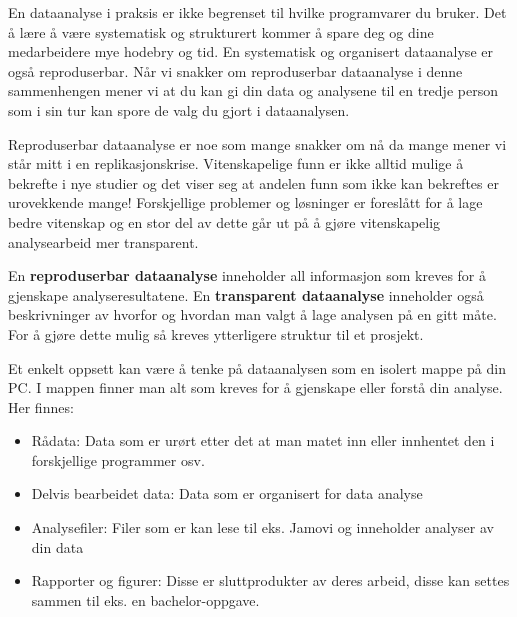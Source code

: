 \documentclass[
  letterpaper,
  DIV=11,
  numbers=noendperiod,
  oneside]{scrreprt}
\begin{document}

En dataanalyse i praksis er ikke begrenset til hvilke programvarer du
bruker. Det å lære å være systematisk og strukturert kommer å spare deg
og dine medarbeidere mye hodebry og tid. En systematisk og organisert
dataanalyse er også reproduserbar. Når vi snakker om reproduserbar
dataanalyse i denne sammenhengen mener vi at du kan gi din data og
analysene til en tredje person som i sin tur kan spore de valg du gjort
i dataanalysen.

Reproduserbar dataanalyse er noe som mange snakker om nå da mange mener
vi står mitt i en replikasjonskrise. Vitenskapelige funn er ikke alltid
mulige å bekrefte i nye studier og det viser seg at andelen funn som
ikke kan bekreftes er urovekkende mange! Forskjellige problemer og
løsninger er foreslått for å lage bedre vitenskap og en stor del av
dette går ut på å gjøre vitenskapelig analysearbeid mer transparent.

En \textbf{reproduserbar dataanalyse} inneholder all informasjon som
kreves for å gjenskape analyseresultatene. En \textbf{transparent
dataanalyse} inneholder også beskrivninger av hvorfor og hvordan man
valgt å lage analysen på en gitt måte. For å gjøre dette mulig så kreves
ytterligere struktur til et prosjekt.

Et enkelt oppsett kan være å tenke på dataanalysen som en isolert mappe
på din PC. I mappen finner man alt som kreves for å gjenskape eller
forstå din analyse. Her finnes:

\begin{itemize}
\item
  Rådata: Data som er urørt etter det at man matet inn eller innhentet
  den i forskjellige programmer osv.
\item
  Delvis bearbeidet data: Data som er organisert for data analyse
\item
  Analysefiler: Filer som er kan lese til eks. Jamovi og inneholder
  analyser av din data
\item
  Rapporter og figurer: Disse er sluttprodukter av deres arbeid, disse
  kan settes sammen til eks. en bachelor-oppgave.
\end{itemize}
\end{document}
